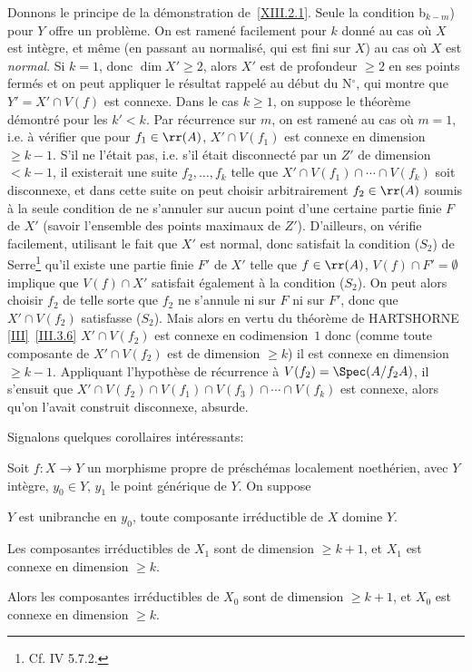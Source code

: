 Donnons le principe de la d\'emonstration de~\ref{XIII.2.1}. Seule la condition b$_{k-m}$) pour $Y$ offre un probl\`eme. On est ramen\'e facilement pour $k$ donn\'e au cas o\`u $X$ est int\`egre, et m\^eme (en passant au normalis\'e, qui est fini sur $X$) au cas o\`u $X$ est \emph{normal}. Si $k=1$, donc $\dim X' \ge 2$, alors $X'$ est de profondeur $\ge 2$ en ses points ferm\'es et on peut appliquer le r\'esultat rappel\'e au d\'ebut du N${}^\circ$, qui montre que \hbox{$Y'=X'\cap V(f)$} est connexe. Dans le cas $k\ge 1$, on suppose le th\'eor\`eme d\'emontr\'e pour les \hbox{$k'\!<\!k$}. Par r\'ecurrence sur $m$, on est ramen\'e au cas o\`u $m=1$, i.e. \`a v\'erifier que pour $f_1\in \rr(A)$, $X'\cap V(f_1)$ est connexe en dimension $\ge k-1$. S'il ne l'\'etait pas, i.e. s'il \'etait disconnect\'e par un $Z'$ de dimension $< k-1$, il existerait une suite $f_2, \dotsc, f_k$ telle que \hbox{$X'\cap V(f_1)\cap\dotsb\cap V(f_k)$} soit disconnexe, et dans cette suite on peut choisir arbitrairement $f_2\in \rr(A)$ soumis \`a la seule condition de ne s'annuler sur aucun point d'une certaine partie finie $F$ de $X'$ (\ignorespaces savoir l'ensemble des points maximaux de $Z'$). D'ailleurs, on v\'erifie facilement, utilisant le fait que $X'$ est normal, donc satisfait la condition ({$S_2$}) de Serre\footnote{Cf. \EGA IV 5.7.2.} qu'il existe une partie finie $F'$ de $X'$ telle que $f\in \rr(A)$, $V(f)\cap F'=\emptyset$ implique que $V(f)\cap X'$ satisfait \'egalement \`a la condition ({$S_2$}). On peut alors choisir $f_2$ de telle sorte que $f_2$ ne s'annule ni sur $F$ ni sur $F'$, donc que $X'\cap V(f_2)$ satisfasse ({$S_2$}). Mais alors en vertu du th\'eor\`eme de HARTSHORNE \ref{III}~\ref{III.3.6} $X'\cap V(f_2)$ est connexe en codimension~$1$ donc (comme toute composante de $X'\cap V(f_2)$ est de dimension $\ge k$) il est connexe en dimension $\ge k-1$. Appliquant l'hypoth\`ese de r\'ecurrence \`a $V(f_2)=\Spec(A/f_2A)$, il s'ensuit que $X'\cap V(f_2)\cap V(f_1)\cap V(f_3)\cap \dotsb\cap V(f_k)$ est connexe, alors qu'on l'avait construit disconnexe, absurde.

Signalons quelques corollaires int\'eressants:

\begin{corollaire} \label{XIII.2.2}
Soit $f\colon X\to Y$ un morphisme propre de pr\'esch\'emas localement noeth\'erien, avec $Y$ int\`egre, $y_0\in Y$, $y_1$ le point g\'en\'erique de $Y$. On suppose
\begin{enumeratea}
\item
$Y$ est unibranche en $y_0$, toute composante irr\'eductible de $X$ domine $Y$.
\item
Les composantes irr\'eductibles de $X_1$ sont de dimension $\ge k+1$, et $X_1$ est connexe en dimension $\ge k$.
\end{enumeratea}

Alors les composantes irr\'eductibles de $X_0$ sont de dimension $\ge k+1$, et $X_0$ est connexe en dimension $\ge k$.
\end{corollaire}

